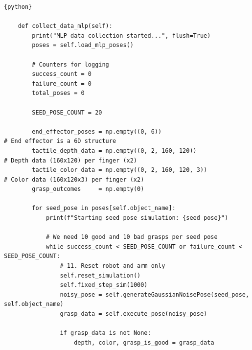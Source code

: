 \documentclass[11pt, a4paper]{report}
\begin{document}
\begin{lstlisting}{python}
        
    def collect_data_mlp(self):
        print("MLP data collection started...", flush=True)
        poses = self.load_mlp_poses()

        # Counters for logging
        success_count = 0
        failure_count = 0
        total_poses = 0

        SEED_POSE_COUNT = 20

        end_effector_poses = np.empty((0, 6))                             # End effector is a 6D structure
        tactile_depth_data = np.empty((0, 2, 160, 120))                   # Depth data (160x120) per finger (x2)
        tactile_color_data = np.empty((0, 2, 160, 120, 3))                # Color data (160x120x3) per finger (x2)
        grasp_outcomes     = np.empty(0)

        for seed_pose in poses[self.object_name]:
            print(f"Starting seed pose simulation: {seed_pose}")

            # We need 10 good and 10 bad grasps per seed pose
            while success_count < SEED_POSE_COUNT or failure_count < SEED_POSE_COUNT:
                # 11. Reset robot and arm only
                self.reset_simulation()
                self.fixed_step_sim(1000)
                noisy_pose = self.generateGaussianNoisePose(seed_pose, self.object_name)
                grasp_data = self.execute_pose(noisy_pose)

                if grasp_data is not None:
                    depth, color, grasp_is_good = grasp_data


\end{lstlisting}
\end{document}
